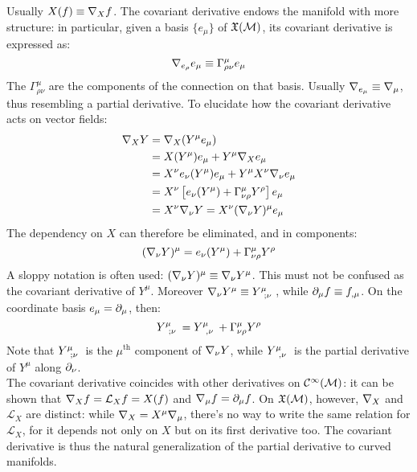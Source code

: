 Usually $ X(f) \equiv \nabla_X f $. The covariant derivative endows the manifold with more structure: in particular, given a basis $ \{e_{\mu}\} $ of $ \mathfrak{X}(\mathcal{M}) $, its covariant derivative is expressed as:
\begin{equation}
  \nabla_{e_{\rho}} e_{\mu} \equiv \Gamma^{\mu}_{\rho \nu} e_{\mu}
  \label{eq:3.24}
\end{equation}
The $ \Gamma^{\mu}_{\rho \nu} $ are the components of the connection on that basis. Usually $ \nabla_{e_{\mu}} \equiv \nabla_{\mu} $, thus resembling a partial derivative. To elucidate how the covariant derivative acts on vector fields:
\begin{equation*}
  \begin{split}
    \nabla_X Y
    &= \nabla_X (Y^\mu e_\mu) \\
    &= X(Y^\mu) e_\mu + Y^\mu \nabla_X e_\mu \\
    &= X^{\nu} e_{\nu} (Y^{\mu}) e_{\mu} + Y^{\mu} X^{\nu} \nabla_{\nu} e_{\mu} \\
    &= X^{\nu} \left[ e_{\nu}(Y^{\mu}) + \Gamma^{\mu}_{\nu \rho} Y^{\rho} \right] e_{\mu} \\
    &= X^{\nu} \nabla_{\nu} Y = X^{\nu} (\nabla_{\nu} Y)^{\mu} e_{\mu}
  \end{split}
\end{equation*}
The dependency on $ X $ can therefore be eliminated, and in components:
\begin{equation}
  (\nabla_\nu Y)^\mu = e_\nu (Y^\mu) + \Gamma^\mu_{\nu \rho} Y^\rho
  \label{eq:3.25}
\end{equation}
A sloppy notation is often used: $ (\nabla_\nu Y)^\mu \equiv \nabla_\nu Y^\mu $. This must not be confused as the covariant derivative of $ Y^\mu $. Moreover $ \na_\nu Y^\mu \equiv \tensor{Y}{^\mu_{;\nu}} $, while $ \partial_\mu f \equiv f_{,\mu} $. On the coordinate basis $ e_\mu = \partial_\mu $, then:
\begin{equation}
  \tensor{Y}{^\mu_{;\nu}} = \tensor{Y}{^\mu_{,\nu}} + \Gamma^\mu_{\nu \rho} Y^\rho
  \label{eq:3.26}
\end{equation}
Note that $ \tensor{Y}{^\mu_{;\nu}} $ is the $ \mu^{\text{th}} $ component of $ \nabla_\nu Y $, while $ \tensor{Y}{^\mu_{,\nu}} $ is the partial derivative of $ Y^{\mu} $ along $ \partial_{\nu} $.\\
The covariant derivative coincides with other derivatives on $ \mathcal{C}^{\infty}(\mathcal{M}) $: it can be shown that $ \nabla_X f = \mathcal{L}_X f = X(f) $ and $ \nabla_\mu f = \partial_\mu f $. On $ \mathfrak{X}(\mathcal{M}) $, however, $ \nabla_X $ and $ \mathcal{L}_X $ are distinct: while $ \nabla_X = X^\mu \nabla_\mu $, there's no way to write the same relation for $ \mathcal{L}_X $, for it depends not only on $ X $ but on its first derivative too. The covariant derivative is thus the natural generalization of the partial derivative to curved manifolds.

